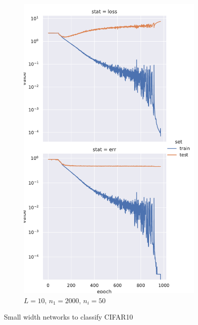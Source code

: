 \documentclass[a4paper]{article}
\begin{document}
\begin{figure}[!ht]
\begin{subfigure}{0.24\textwidth}
    \includegraphics[width=\columnwidth]{cifar10/L_10_n1_2000_w_50}
    \caption{$L = 10$, $n_1=2000$, $n_i = 50$}
\end{subfigure}
\caption{Small width networks to classify CIFAR10}
\label{fig:cifar10-small-width}
\end{figure}
\end{document}
